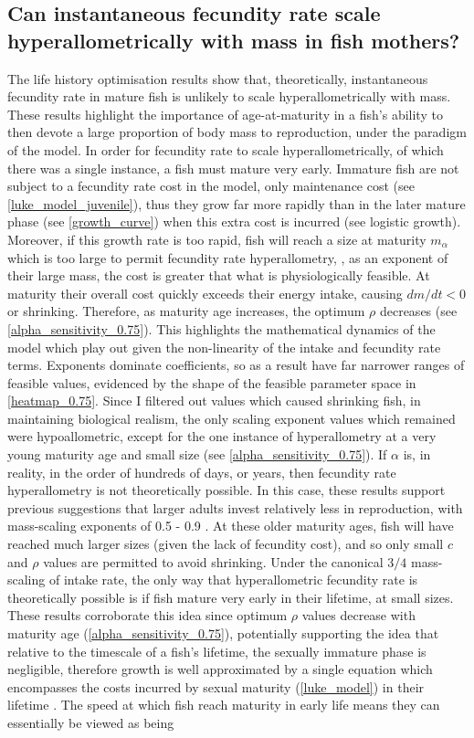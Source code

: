 \documentclass[a4paper]{article} %
\begin{document}
\subsection{Can instantaneous fecundity rate scale hyperallometrically with mass in fish mothers?}
The life history optimisation results show that, theoretically, instantaneous fecundity rate in mature fish is unlikely to scale hyperallometrically with mass. These results highlight the importance of age-at-maturity in a fish's ability to then devote a large proportion of body mass to reproduction, under the paradigm of the model. In order for fecundity rate to scale hyperallometrically, of which there was a single instance, a fish must mature very early. Immature fish are not subject to a fecundity rate cost in the model, only maintenance cost (see \cref{luke_model_juvenile}), thus they grow far more rapidly than in the later mature phase (see \cref{growth_curve}) when this extra cost is incurred (see logistic growth). Moreover, if this growth rate is too rapid, fish will reach a size at maturity $m_{\alpha}$ which is too large \autocite{Arendt2011} to permit fecundity rate hyperallometry, , as an exponent of their large mass, the cost is greater that what is physiologically feasible. At maturity their overall cost quickly exceeds their energy intake, causing $dm/dt < 0$ or shrinking. Therefore, as maturity age increases, the optimum $\rho$ decreases (see \cref{alpha_sensitivity_0.75}). This highlights the mathematical dynamics of the model which play out given the non-linearity of the intake and fecundity rate terms. Exponents dominate coefficients, so as a result have far narrower ranges of feasible values, evidenced by the shape of the feasible parameter space in \cref{heatmap_0.75}. Since I filtered out values which caused shrinking fish, in maintaining biological realism, the only scaling exponent values which remained were hypoallometric, except for the one instance of hyperallometry at a very young maturity age and small size (see \cref{alpha_sensitivity_0.75}). If $\alpha$ is, in reality, in the order of hundreds of days, or years, then fecundity rate hyperallometry is not theoretically possible. In this case, these results support previous suggestions that larger adults invest relatively less in reproduction, with mass-scaling exponents of 0.5 - 0.9 \autocite{Reiss1985, Stearns2000}. At these older maturity ages, fish will have reached much larger sizes (given the lack of fecundity cost), and so only small $c$ and $\rho$ values are permitted to avoid shrinking. Under the canonical $3/4$ mass-scaling of intake rate, the only way that hyperallometric fecundity rate is theoretically possible is if fish mature very early in their lifetime, at small sizes. These results corroborate this idea since optimum $\rho$ values decrease with maturity age (\cref{alpha_sensitivity_0.75}), potentially supporting the idea that relative to the timescale of a fish's lifetime, the sexually immature phase is negligible, therefore growth is well approximated by a single equation which encompasses the costs incurred by sexual maturity (\cref{luke_model}) in their lifetime \autocite{West2001}. The speed at which fish reach maturity in early life means they can essentially be viewed as being 
\end{document}
